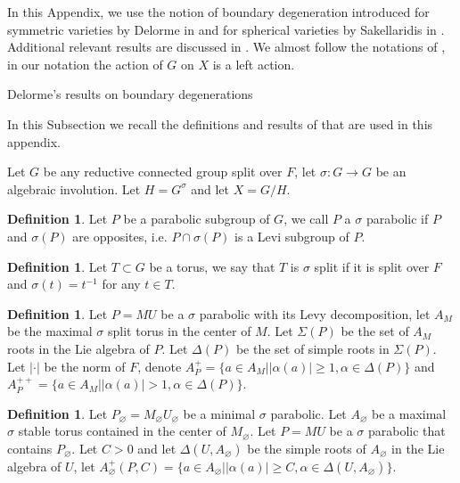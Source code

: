 \documentclass[12pt]{article}
\newcommand{\<}{\langle}
\renewcommand{\>}{\rangle}
\renewcommand{\emptyset}{\varnothing}
\theoremstyle{plain}
\theoremstyle{definition}
\newtheorem{defn}[theorem]{Definition}
\begin{document}
In this Appendix, we use the notion of boundary degeneration introduced for symmetric varieties by Delorme in \cite{NeighborhoodsInf} and for spherical varieties by Sakellaridis in \cite{sakellaridis2017periods}. Additional relevant results are discussed in \cite{Delorme2014PaleyWienerTF}. We almost follow the notations of \cite{NeighborhoodsInf}, in our notation the action of $G$ on $X$ is a left action.


\begin{subsection}{Delorme's results on boundary degenerations}

In this Subsection we recall the definitions and results of \cite{NeighborhoodsInf} that are used in this appendix.

Let $G$ be any reductive connected group split over $F$, let $\sigma:G\rightarrow G$ be an algebraic involution. Let $H=G^\sigma$ and let $X=G/H$. 

\begin{defn}
    Let $P$ be a parabolic subgroup of $G$, we call $P$ a $\sigma$ parabolic if $P$ and $\sigma(P)$ are opposites, i.e. $P\cap \sigma(P)$ is a Levi subgroup of $P$.
\end{defn}

\begin{defn}
    Let $T\subset G$ be a torus, we say that $T$ is $\sigma$ split if it is split over $F$ and $\sigma(t)=t^{-1}$ for any $t\in T$.
\end{defn}

\begin{defn}
    Let $P=MU$ be a $\sigma$ parabolic with its Levy decomposition, let $A_M$ be the maximal $\sigma$ split torus in the center of $M$.
    Let $\Sigma(P)$ be the set of $A_M$ roots in the Lie algebra of $P$. Let $\Delta(P)$ be the set of simple roots in $\Sigma(P)$. Let $|\cdot|$ be the norm of $F$, denote
    $A^+_P=\{a\in A_M||\alpha(a)|\geq 1, \alpha\in \Delta(P)\}$ and  $A^{++}_P=\{a\in A_M||\alpha(a)|> 1, \alpha\in \Delta(P)\}$.
\end{defn}

\begin{defn}
    Let $P_\emptyset=M_\emptyset U_\emptyset$ be a minimal $\sigma$ parabolic. Let $A_\emptyset$ be a maximal $\sigma$ stable torus contained in the center of $M_\emptyset$. Let $P=MU$ be a $\sigma$ parabolic that contains $P_\emptyset$. Let $C>0$ and let $\Delta(U,A_\emptyset)$ be the simple roots of $A_\emptyset$ in the Lie algebra of $U$, let $A^+_\emptyset(P,C)=\{a\in A_\emptyset ||\alpha(a)|\geq C,\alpha\in \Delta(U,A_\emptyset)\}$.
\end{defn}


\end{subsection}
\end{document}
